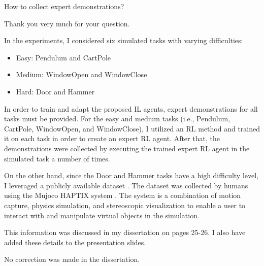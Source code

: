 
\begin{revcomment}
  How to collect expert demonstrations?
\end{revcomment}

\begin{revresponse}
  Thank you very much for your question.

  In the experiments, I considered six simulated tasks with varying difficulties:
  \begin{itemize}
    \item Easy: Pendulum and CartPole
    \item Medium: WindowOpen and WindowClose
    \item Hard: Door and Hammer
  \end{itemize}

  In order to train and adapt the proposed IL agents,
  expert demonstrations for all tasks must be provided.
  For the easy and medium tasks
  (i.e., Pendulum, CartPole, WindowOpen, and WindowClose),
  I utilized an RL method and trained it on each task in order to create an expert RL agent.
  After that,
  the demonstrations were collected by executing the trained expert RL agent in the simulated task a number of times.

  On the other hand,
  since the Door and Hammer tasks have a high difficulty level,
  I leveraged a publicly available dataset \cite{Task_Adroit}.
  The dataset was collected by humans using the Mujoco HAPTIX system \cite{Mujoco_HAPTIX}.
  The system is a combination of motion capture,
  physics simulation,
  and stereoscopic visualization to enable a user to interact with and manipulate virtual objects in the simulation.

  This information was discussed in my dissertation on pages 25-26.
  I also have added these details to the presentation slides.


  \begin{correction}
    No correction was made in the dissertation.
  \end{correction}

\end{revresponse}
